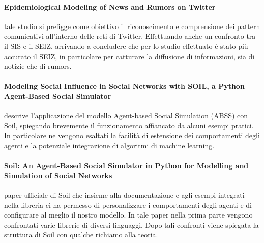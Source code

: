     \paragraph{Epidemiological Modeling of News and Rumors on Twitter\cite{Paper4_Epidemiological}} tale studio si prefigge come obiettivo il riconoscimento e comprensione dei pattern comunicativi all’interno delle reti di Twitter. Effettuando anche un confronto tra il SIS e il SEIZ, arrivando a concludere che per lo studio effettuato è stato più accurato il SEIZ, in particolare per catturare la diffusione di informazioni, sia di notizie che di rumors.
    
    \paragraph{Modeling Social Influence in Social Networks with SOIL, a Python Agent-Based Social Simulator\cite{Paper5_Modeling}}
    descrive l'applicazione del modello Agent-based Social Simulation (ABSS) con Soil, spiegando brevemente il funzionamento affiancato da alcuni esempi pratici. In particolare ne vengono esaltati la facilità di estensione dei comportamenti degli agenti e la potenziale integrazione di algoritmi di machine learning.
    
    \paragraph{Soil: An Agent-Based Social Simulator in Python for Modelling and Simulation of Social Networks\cite{Paper6_Soil}}
    paper ufficiale di Soil che insieme alla documentazione e agli esempi integrati nella libreria ci ha permesso di personalizzare i comportamenti degli agenti e di configurare al meglio il nostro modello. In tale paper nella prima parte vengono confrontati varie librerie di diversi linguaggi. Dopo tali confronti viene spiegata la struttura di Soil con qualche richiamo alla teoria.